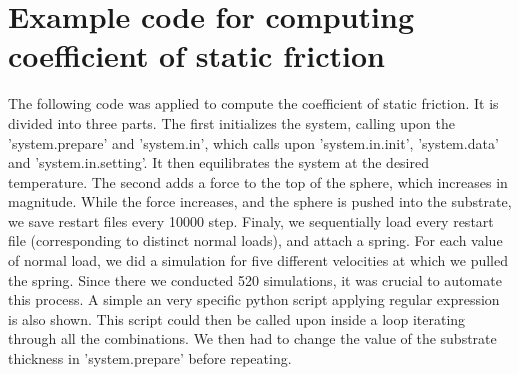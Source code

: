 \documentclass[twoside,english]{uiofysmaster}
\begin{document}
\section{Example code for computing coefficient of static friction}
The following code was applied to compute the coefficient of static friction. 
It is divided into three parts.
The first initializes the system, calling upon the 'system.prepare' and 'system.in', which calls upon 'system.in.init', 'system.data' and 'system.in.setting'. 
It then equilibrates the system at the desired temperature.
The second adds a force to the top of the sphere, which increases in magnitude. 
While the force increases, and the sphere is pushed into the substrate, we save restart files every 10000 step. 
Finaly, we sequentially load every restart file (corresponding to distinct normal loads), and attach a spring.
For each value of normal load, we did a simulation for five different velocities at which we pulled the spring.
Since there we conducted 520 simulations, it was crucial to automate this process. 
A simple an very specific python script applying regular expression is also shown.
This script could then be called upon inside a loop iterating through all the combinations.
We then had to change the value of the substrate thickness in 'system.prepare' before repeating.



\newpage





\newpage


\newpage

\newpage


\newpage














\end{document}
